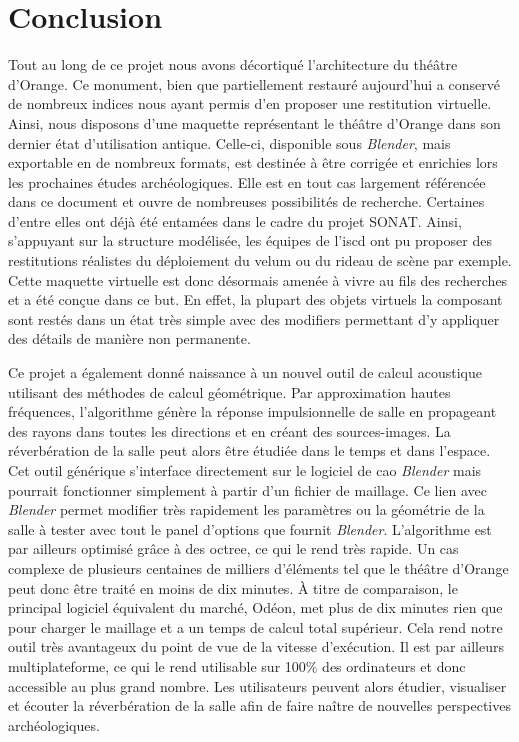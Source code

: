 \chapter*{Conclusion}
	
	
Tout au long de ce projet nous avons décortiqué l'architecture du théâtre d'Orange. Ce monument, bien que partiellement restauré aujourd'hui a conservé de nombreux indices nous ayant permis d'en proposer une restitution virtuelle. Ainsi, nous disposons d'une maquette représentant le théâtre d'Orange dans son dernier état d'utilisation antique. Celle-ci, disponible sous \textit{Blender}, mais exportable en de nombreux formats, est destinée à être corrigée et enrichies lors les prochaines études archéologiques. Elle est en tout cas largement référencée dans ce document et ouvre de nombreuses possibilités de recherche. Certaines d'entre elles ont déjà été entamées dans le cadre du projet SONAT. Ainsi, s'appuyant sur la structure modélisée, les équipes de l'\gls{iscd} ont pu proposer des restitutions réalistes du déploiement du \gls{velum} ou du rideau de scène par exemple. Cette maquette virtuelle est donc désormais amenée à vivre au fils des recherches et a été conçue dans ce but. En effet, la plupart des objets virtuels la composant sont restés dans un état très simple avec des \glspl{modifier} permettant d'y appliquer des détails de manière non permanente.

Ce projet a également donné naissance à un nouvel outil de calcul acoustique utilisant des méthodes de calcul géométrique. Par approximation hautes fréquences, l'algorithme génère la réponse impulsionnelle de salle en propageant des rayons dans toutes les directions et en créant des sources-images. La réverbération de la salle peut alors être étudiée dans le temps et dans l'espace. Cet outil générique s'interface directement sur le logiciel de \gls{cao} \textit{Blender} mais pourrait fonctionner simplement à partir d'un fichier de maillage. Ce lien avec \textit{Blender} permet modifier très rapidement les paramètres ou la géométrie de la salle à tester avec tout le panel d'options que fournit \textit{Blender}. L'algorithme est par ailleurs optimisé grâce à des \gls{octree}, ce qui le rend très rapide. Un cas complexe de plusieurs centaines de milliers d'éléments tel que le théâtre d'Orange peut donc être traité en moins de dix minutes. À titre de comparaison, le principal logiciel équivalent du marché, Odéon, met plus de dix minutes rien que pour charger le maillage et a un temps de calcul total supérieur. Cela rend notre outil très avantageux du point de vue de la vitesse d'exécution. Il est par ailleurs multiplateforme, ce qui le rend utilisable sur 100\% des ordinateurs et donc accessible au plus grand nombre. Les utilisateurs peuvent alors étudier, visualiser et écouter la réverbération de la salle afin de faire naître de nouvelles perspectives archéologiques.

